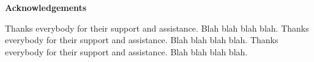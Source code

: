 \thispagestyle{empty}
\null\vfil
\begin{center}
{\large\bfseries{Acknowledgements}}
\end{center}
Thanks everybody for their support and assistance. Blah blah blah blah.  Thanks 
everybody for their support and assistance. Blah blah blah blah.  Thanks 
everybody for their support and assistance. Blah blah blah blah.  
{\par\vfil\null}
\newpage
